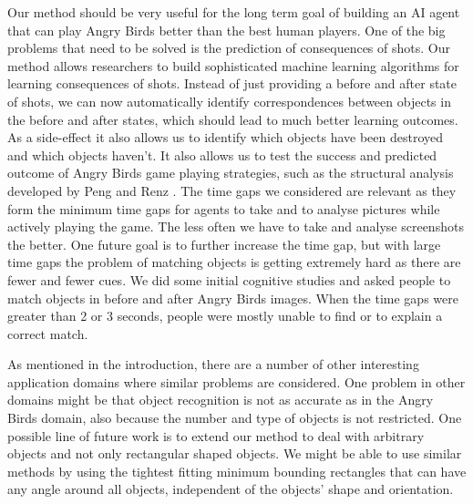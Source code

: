 \documentclass[letterpaper]{article}
\begin{document}
Our method should be very useful for the long term goal of building an AI agent that can play Angry Birds better than the best human players. One of the big problems that need to be solved is the prediction of consequences of shots. Our method allows researchers to build sophisticated machine learning algorithms for learning consequences of shots. Instead of just providing a before and after state of shots, we can now automatically identify correspondences between objects in the before and after states, which should lead to much better learning outcomes. As a side-effect it also allows us to identify which objects have been destroyed and which objects haven't. 
It also allows us to test the success and predicted outcome of Angry Birds game playing strategies, such as the structural analysis developed by Peng and Renz \cite{peng13}. 
The time gaps we considered are relevant as they form the minimum time gaps for agents to take and to analyse pictures while actively playing the game. The less often we have to take and analyse screenshots the better. One future goal is to further increase the time gap, but with large time gaps the problem of matching objects is getting extremely hard as there are fewer and fewer cues. We did some initial cognitive studies and asked people to match objects in before and after Angry Birds images. When the time gaps were greater than 2 or 3 seconds, people were mostly unable to find or to explain a correct match. 

As mentioned in the introduction, there are a number of other interesting application domains where similar problems are considered. One problem in other domains might be that object recognition is not as accurate as in the Angry Birds domain, also because the number and type of objects is not restricted. 
One possible line of future work is to extend our method to deal with arbitrary objects and not only rectangular shaped objects. We might be able to use similar methods by using the tightest fitting minimum bounding rectangles that can have any angle around all objects, independent of the objects' shape and orientation.   
\end{document}
